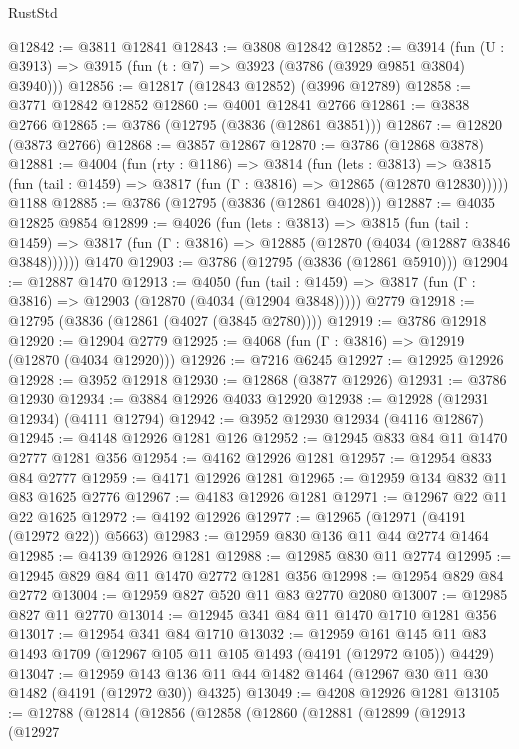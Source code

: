 \begin{lexlean}{RustStd}
\begin{coremodule}
@12842 := @3811 @12841
@12843 := @3808 @12842
@12852 := @3914 (fun (U : @3913) => @3915 (fun (t : @7) => @3923 (@3786 (@3929 @9851 @3804) @3940)))
@12856 := @12817 (@12843 @12852) (@3996 @12789)
@12858 := @3771 @12842 @12852
@12860 := @4001 @12841 @2766
@12861 := @3838 @2766
@12865 := @3786 (@12795 (@3836 (@12861 @3851)))
@12867 := @12820 (@3873 @2766)
@12868 := @3857 @12867
@12870 := @3786 (@12868 @3878)
@12881 := @4004
    (fun (rty : @1186) =>
    @3814
      (fun (lets : @3813) =>
      @3815 (fun (tail : @1459) => @3817 (fun (Γ : @3816) => @12865 (@12870 @12830)))))
    @1188
@12885 := @3786 (@12795 (@3836 (@12861 @4028)))
@12887 := @4035 @12825 @9854
@12899 := @4026
    (fun (lets : @3813) =>
    @3815
      (fun (tail : @1459) =>
      @3817 (fun (Γ : @3816) => @12885 (@12870 (@4034 (@12887 @3846 @3848))))))
    @1470
@12903 := @3786 (@12795 (@3836 (@12861 @5910)))
@12904 := @12887 @1470
@12913 := @4050
    (fun (tail : @1459) => @3817 (fun (Γ : @3816) => @12903 (@12870 (@4034 (@12904 @3848)))))
    @2779
@12918 := @12795 (@3836 (@12861 (@4027 (@3845 @2780))))
@12919 := @3786 @12918
@12920 := @12904 @2779
@12925 := @4068 (fun (Γ : @3816) => @12919 (@12870 (@4034 @12920)))
@12926 := @7216 @6245
@12927 := @12925 @12926
@12928 := @3952 @12918
@12930 := @12868 (@3877 @12926)
@12931 := @3786 @12930
@12934 := @3884 @12926 @4033 @12920
@12938 := @12928 (@12931 @12934) (@4111 @12794)
@12942 := @3952 @12930 @12934 (@4116 @12867)
@12945 := @4148 @12926 @1281 @126
@12952 := @12945 @833 @84 @11 @1470 @2777 @1281 @356
@12954 := @4162 @12926 @1281
@12957 := @12954 @833 @84 @2777
@12959 := @4171 @12926 @1281
@12965 := @12959 @134 @832 @11 @83 @1625 @2776
@12967 := @4183 @12926 @1281
@12971 := @12967 @22 @11 @22 @1625
@12972 := @4192 @12926
@12977 := @12965 (@12971 (@4191 (@12972 @22)) @5663)
@12983 := @12959 @830 @136 @11 @44 @2774 @1464
@12985 := @4139 @12926 @1281
@12988 := @12985 @830 @11 @2774
@12995 := @12945 @829 @84 @11 @1470 @2772 @1281 @356
@12998 := @12954 @829 @84 @2772
@13004 := @12959 @827 @520 @11 @83 @2770 @2080
@13007 := @12985 @827 @11 @2770
@13014 := @12945 @341 @84 @11 @1470 @1710 @1281 @356
@13017 := @12954 @341 @84 @1710
@13032 := @12959
    @161
    @145
    @11
    @83
    @1493
    @1709
    (@12967 @105 @11 @105 @1493 (@4191 (@12972 @105)) @4429)
@13047 := @12959 @143 @136 @11 @44 @1482 @1464 (@12967 @30 @11 @30 @1482 (@4191 (@12972 @30)) @4325)
@13049 := @4208 @12926 @1281
@13105 := @12788
    (@12814
      (@12856
        (@12858
          (@12860
            (@12881
              (@12899
                (@12913
                  (@12927

\end{coremodule}
\end{lexlean}
